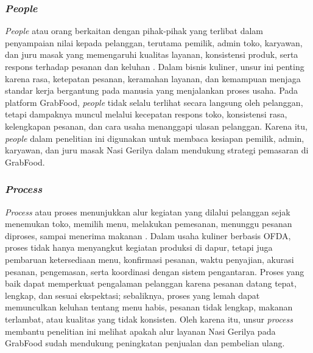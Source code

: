 \subsubsection{\textit{People}}
\textit{People} atau orang berkaitan dengan pihak-pihak yang terlibat dalam penyampaian nilai kepada pelanggan, terutama pemilik, admin toko, karyawan, dan juru masak yang memengaruhi kualitas layanan, konsistensi produk, serta respons terhadap pesanan dan keluhan \parencite{wirtz2024servicesmarketing,ramadhanti2023rucika}. Dalam bisnis kuliner, unsur ini penting karena rasa, ketepatan pesanan, keramahan layanan, dan kemampuan menjaga standar kerja bergantung pada manusia yang menjalankan proses usaha. Pada platform GrabFood, \textit{people} tidak selalu terlihat secara langsung oleh pelanggan, tetapi dampaknya muncul melalui kecepatan respons toko, konsistensi rasa, kelengkapan pesanan, dan cara usaha menanggapi ulasan pelanggan. Karena itu, \textit{people} dalam penelitian ini digunakan untuk membaca kesiapan pemilik, admin, karyawan, dan juru masak Nasi Gerilya dalam mendukung strategi pemasaran di GrabFood.

\subsubsection{\textit{Process}}
\textit{Process} atau proses menunjukkan alur kegiatan yang dilalui pelanggan sejak menemukan toko, memilih menu, melakukan pemesanan, menunggu pesanan diproses, sampai menerima makanan \parencite{wirtz2024servicesmarketing}. Dalam usaha kuliner berbasis OFDA, proses tidak hanya menyangkut kegiatan produksi di dapur, tetapi juga pembaruan ketersediaan menu, konfirmasi pesanan, waktu penyajian, akurasi pesanan, pengemasan, serta koordinasi dengan sistem pengantaran. Proses yang baik dapat memperkuat pengalaman pelanggan karena pesanan datang tepat, lengkap, dan sesuai ekspektasi; sebaliknya, proses yang lemah dapat memunculkan keluhan tentang menu habis, pesanan tidak lengkap, makanan terlambat, atau kualitas yang tidak konsisten. Oleh karena itu, unsur \textit{process} membantu penelitian ini melihat apakah alur layanan Nasi Gerilya pada GrabFood sudah mendukung peningkatan penjualan dan pembelian ulang.

